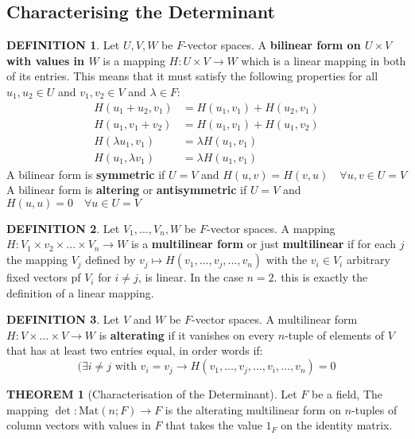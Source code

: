 \documentclass[10pt]{article}
\theoremstyle{definition}
\newtheorem{definition}{DEFINITION}[subsection]
\newtheorem{theorem}{THEOREM}[subsection]
\newcommand{\Mat}{\text{Mat}}
\begin{document}
\subsection{Characterising the Determinant}
\begin{definition}
    Let $U,V,W$ be $F$-vector spaces. A \textbf{bilinear form on $U \times V$ with values in $W$} is a mapping $H:U \times V \rightarrow W$ which is a linear mapping in both of its entries. This means that it must satisfy the following properties for all $u_1, u_2 \in U$ and $v_1, v_2 \in V $ and $\lambda \in F$:
    \[\begin{split}
        H(u_1 + u_2, v_1) &= H(u_1, v_1) + H(u_2, v_1)\\
        H(u_1, v_1 + v_2) &= H(u_1, v_1) + H(u_1, v_2)\\
        H(\lambda u_1, v_1) &= \lambda H(u_1, v_1)\\
        H(u_1,\lambda v_1) &= \lambda H(u_1, v_1)
    \end{split}\]
    A bilinear form is \textbf{symmetric} if $U = V$ and $H(u,v) = H(v,u) \quad \forall u,v \in U =V$\\
    A bilinear form is \textbf{altering} or \textbf{antisymmetric} if $U = V$ and $H(u,u) = 0 \quad \forall u \in U =V$
\end{definition}

\begin{definition}
    Let $V_1, ..., V_n, W$ be $F$-vector spaces. A mapping $H:V_1\times v_2\times ... \times V_n \rightarrow W$ is a \textbf{multilinear form} or just \textbf{multilinear} if for each $j$ the mapping $V_j$ defined by $v_j \mapsto H(v_1,...,v_j,...,v_n)$ with the $v_i\in V_i$ arbitrary fixed vectors pf $V_i$ for $i \neq j$, is linear. In the case $n = 2$. this is exactly the definition of a linear mapping.
\end{definition}

\begin{definition}
    Let $V$ and $W$ be $F$-vector spaces. A multilinear form $H:V\times ... \times V \rightarrow W$ is \textbf{alterating} if it vanishes on every $n$-tuple of elements of $V$ that has at least two entries equal, in order words if:
    $$(\exists i \neq j \text{ with } v_i = v_j \rightarrow H(v_1,...,v_j,...,v_i,...,v_n) = 0$$
\end{definition}

\begin{theorem}[Characterisation of the Determinant]
    Let $F$ be a field, The mapping $\det: \Mat(n;F) \rightarrow F$ is the alterating multilinear form on $n$-tuples of column vectors with values in $F$ that takes the value $1_F$ on the identity matrix.
\end{theorem}
\end{document}
